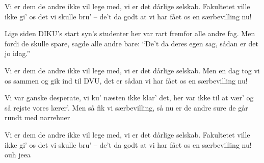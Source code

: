\documentclass[a4paper,11pt]{article}
\begin{document}
\begin{song}

Vi er dem de andre ikke vil lege med,
vi er det dårlige selskab.
Fakultetet ville ikke gi' os det vi skulle bru' --
de't da godt at vi har fået os en særbevilling nu!

Lige siden DIKU's start
syn's studenter her var rart
fremfor alle andre fag.
Men fordi de skulle spare,
sagde alle andre bare:
``De't da deres egen sag,
sådan er det jo idag.''

Vi er dem de andre ikke vil lege med,
vi er det dårlige selskab.
Men en dag tog vi os sammen og gik ind til DVU,
det er sådan vi har fået os en særbevilling nu!

Vi var ganske desperate,
vi ku' næsten ikke klar' det,
her var ikke til at vær'
og så rejste vores lærer'.
Men så fik vi særbevilling,
så nu er de andre sure
de går rundt med narrehuer

Vi er dem de andre ikke vil lege med,
vi er det dårlige selskab.
Fakultetet ville ikke gi' os det vi skulle bru' --
de't da godt at vi har fået os en særbevilling nu!
ouh jeea
\end{song}
\end{document}
